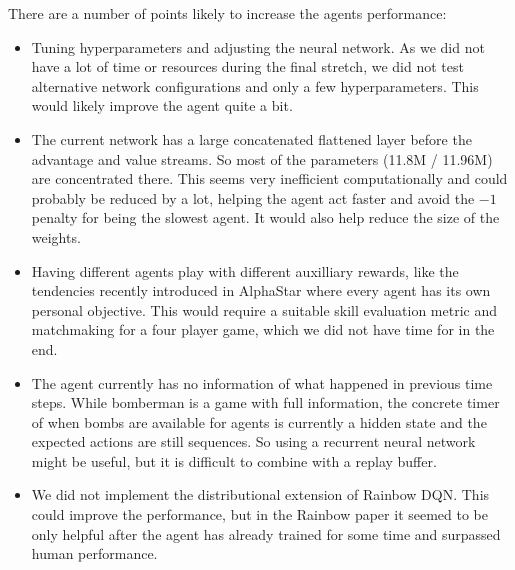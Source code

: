 There are a number of points likely to increase the agents performance:
\begin{itemize}
\item{Tuning hyperparameters and adjusting the neural network. As we did not have a lot of time or resources during the final stretch, we did not test alternative network configurations and only a few hyperparameters. This would likely improve the agent quite a bit.}
\item{The current network has a large concatenated flattened layer before the advantage and value streams. So most of the parameters (11.8M / 11.96M) are concentrated there. This seems very inefficient computationally and could probably be reduced by a lot, helping the agent act faster and avoid the $-1$ penalty for being the slowest agent. It would also help reduce the size of the weights.}
\item{Having different agents play with different auxilliary rewards, like the tendencies recently introduced in AlphaStar\cite{alphastarblog} where every agent has its own personal objective. This would require a suitable skill evaluation metric and matchmaking for a four player game, which we did not have time for in the end.}
\item{The agent currently has no information of what happened in previous time steps. While bomberman is a game with full information, the concrete timer of when bombs are available for agents is currently a hidden state and the expected actions are still sequences. So using a recurrent neural network might be useful, but it is difficult to combine with a replay buffer.}
\item{We did not implement the distributional extension of Rainbow DQN. This could improve the performance, but in the Rainbow paper\cite{Hessel2018RainbowCI} it seemed to be only helpful after the agent has already trained for some time and surpassed human performance.}
\end{itemize}

